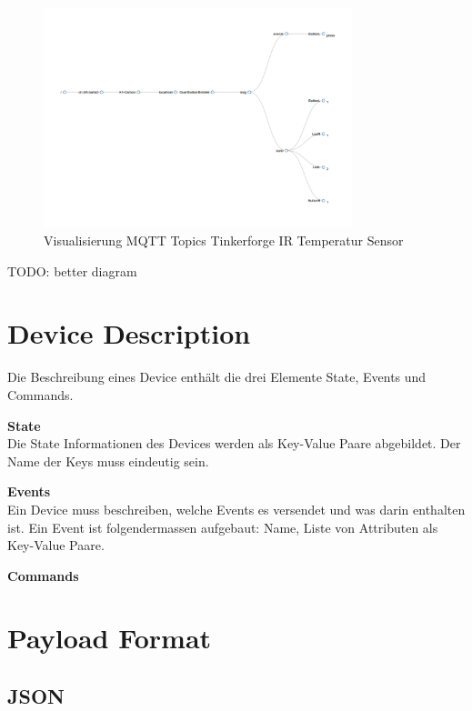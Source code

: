 \begin{figure}[H]
	\centering
		\includegraphics[width=0.8\textwidth]{bilder/TopicHierarchie_Bsp_Dualbutton.png}
	\caption{\label{fig:tempitTopics}Visualisierung MQTT Topics Tinkerforge IR Temperatur Sensor}
\end{figure}

TODO: better diagram



\section{Device Description}

Die Beschreibung eines Device enthält die drei Elemente State, Events und Commands.

\textbf{State} \\
Die State Informationen des Devices werden als Key-Value Paare abgebildet. Der Name der Keys muss eindeutig sein.

\textbf{Events} \\
Ein Device muss beschreiben, welche Events es versendet und was darin enthalten ist.
Ein Event ist folgendermassen aufgebaut:
Name, Liste von Attributen als Key-Value Paare.

\textbf{Commands}

\section{Payload Format}

\subsection{JSON}
